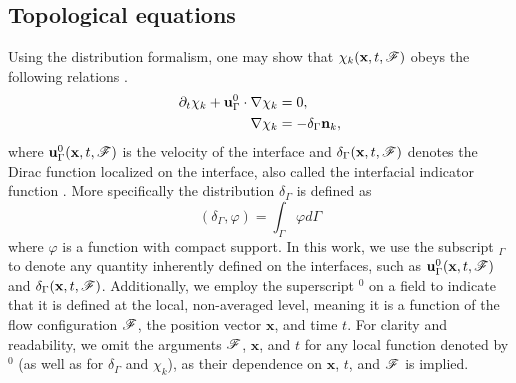 
\subsection{Topological equations}
Using the distribution formalism, one may show that $\chi_k(\textbf{x},t,\mathscr{F})$ obeys the following relations \citep{drew1983mathematical}. 
\begin{align}
    \pddt \chi_k
    + \textbf{u}_\Gamma^0 \cdot \grad \chi_k
    &= 0,
    \label{eq:dt_chi_k}\\
    \label{eq:grad_chi_k}
    \grad \chi_k
    &= - \delta_\Gamma \textbf{n}_k, 
\end{align}
where $\textbf{u}^0_\Gamma(\textbf{x},t,\mathscr{F})$ is the velocity of the interface and $\delta_\Gamma(\textbf{x},t,\mathscr{F})$ denotes the Dirac function localized on the interface, also called the interfacial indicator function \citep{drew1983mathematical,junqua2003}. 
More specifically the distribution $\delta_\Gamma$ is defined as \citep{appel2007}
\begin{equation}
(\delta_\Gamma,\varphi) =\int_{\Gamma} \varphi d\Gamma 
\label{eq:def_surf_distribution}
\end{equation}  
where $\varphi$ is a function with compact support. %
In this work, we use the subscript $_\Gamma$ to denote any quantity inherently defined on the interfaces, such as $\textbf{u}_\Gamma^0(\textbf{x}, t, \mathscr{F})$ and $\delta_\Gamma(\textbf{x}, t, \mathscr{F})$. Additionally, we employ the superscript $^0$ on a field to indicate that it is defined at the local, non-averaged level, meaning it is a function of the flow configuration $\mathscr{F}$, the position vector $\textbf{x}$, and time $t$. For clarity and readability, we omit the arguments $\mathscr{F}$, $\textbf{x}$, and $t$ for any local function denoted by $^0$ (as well as for $\delta_\Gamma$ and $\chi_k$), as their dependence on $\textbf{x}$, $t$, and $\mathscr{F}$ is implied.

